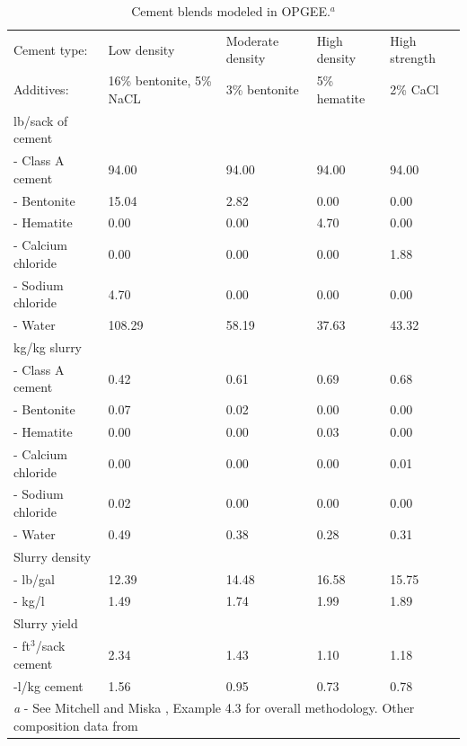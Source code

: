 \documentclass[11pt]{report}
\begin{document}
{{{{\begin{table}
\begin{scriptsize}
\caption{Cement blends modeled in OPGEE.$^a$}
\label{tab:cements}
\begin{tabular*}{1\columnwidth}{p{}p{}p{}p{}p{}}
\toprule
Cement type: & Low density & Moderate density & High density & High strength \\
Additives: & 16\% bentonite, 5\% NaCL & 3\% bentonite & 5\% hematite & 2\% CaCl \\
\midrule
lb/sack of cement & & & & \\ 
- Class A cement &94.00 &94.00 &94.00 &94.00 \\
- Bentonite &15.04 &2.82 &0.00 &0.00 \\
- Hematite &0.00 &0.00 &4.70 &0.00 \\
- Calcium chloride &0.00 &0.00 &0.00 &1.88 \\
- Sodium chloride &4.70 &0.00 &0.00 &0.00 \\ 
- Water &108.29 &58.19 &37.63 &43.32 \\
\midrule
kg/kg slurry & & & & \\ 
- Class A cement &0.42 &0.61 &0.69 &0.68 \\
- Bentonite &0.07 &0.02 &0.00 &0.00 \\
- Hematite &0.00 &0.00 &0.03 &0.00 \\
- Calcium chloride &0.00 &0.00 &0.00 &0.01 \\
- Sodium chloride &0.02 &0.00 &0.00 &0.00 \\
- Water &0.49 &0.38 &0.28 &0.31 \\
\midrule
Slurry density & & & & \\ 
- lb/gal &12.39 &14.48 &16.58 &15.75 \\
- kg/l &1.49 &1.74 &1.99 &1.89 \\
\midrule
Slurry yield & & & & \\ 
- ft$^3$/sack cement &2.34 &1.43 &1.10 &1.18\\
-l/kg cement &1.56 &0.95 &0.73 &0.78\\
\bottomrule 
\multicolumn{5}{p{1\columnwidth}}{\emph{a} - See Mitchell and Miska \cite[Example 4.3]{Mitchell2011}, Example 4.3 for overall methodology. Other composition data from \cite[Example 4.4, 4.5]{Mitchell2011}}\\
\end{tabular*}
\end{scriptsize}
\end{table}

}}}}
\end{document}

